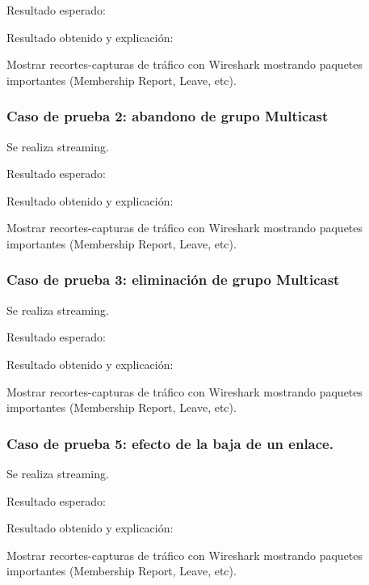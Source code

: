 \documentclass[12pt,a4paper,oneside]{book}
\begin{document}
\vspace{0.5cm}
Resultado esperado: 

\vspace{0.5cm}
Resultado obtenido y explicación: 

\vspace{0.5cm}
Mostrar recortes-capturas de tráfico con Wireshark mostrando paquetes importantes (Membership Report, Leave, etc).

\subsubsection{Caso de prueba 2: abandono de grupo Multicast} 

Se realiza streaming.

\vspace{0.5cm}
Resultado esperado: 

\vspace{0.5cm}
Resultado obtenido y explicación: 

\vspace{0.5cm}
Mostrar recortes-capturas de tráfico con Wireshark mostrando paquetes importantes (Membership Report, Leave, etc).

\subsubsection{Caso de prueba 3: eliminación de grupo Multicast} 
Se realiza streaming.

\vspace{0.5cm}
Resultado esperado: 

\vspace{0.5cm}
Resultado obtenido y explicación: 

\vspace{0.5cm}
Mostrar recortes-capturas de tráfico con Wireshark mostrando paquetes importantes (Membership Report, Leave, etc).

\subsubsection{Caso de prueba 5: efecto de la baja de un enlace.} 
Se realiza streaming.

\vspace{0.5cm}
Resultado esperado: 

\vspace{0.5cm}
Resultado obtenido y explicación: 

\vspace{0.5cm}
Mostrar recortes-capturas de tráfico con Wireshark mostrando paquetes importantes (Membership Report, Leave, etc).
\end{document}
